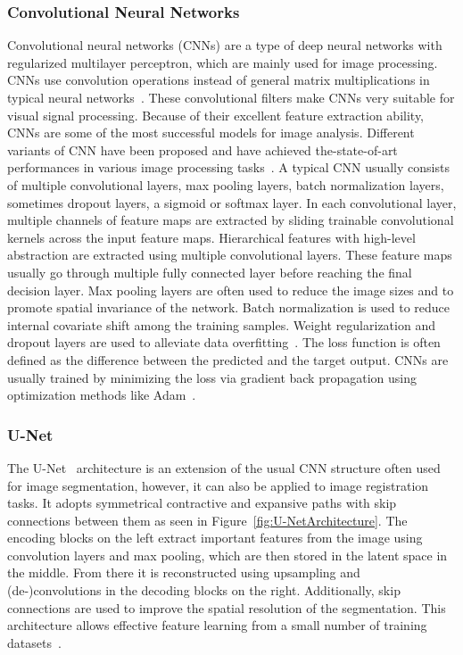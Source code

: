 \subsubsection{Convolutional Neural Networks} \label{SubSubSec:CNNs}
Convolutional neural networks (CNNs) are a type of deep neural networks with regularized multilayer perceptron, which are mainly used for image processing. CNNs use convolution operations instead of general matrix multiplications in typical neural networks~\cite{CNN1,CNN2}. These convolutional filters make CNNs very suitable for visual signal processing. Because of their excellent feature extraction ability, CNNs are some of the most successful models for image analysis. Different variants of CNN have been proposed and have achieved the-state-of-art performances in various image processing tasks~\cite{CNN2}. A typical CNN usually consists of multiple convolutional layers, max pooling layers, batch normalization layers, sometimes dropout layers, a sigmoid or softmax layer. In each convolutional layer, multiple channels of feature maps are extracted by sliding trainable convolutional kernels across the input feature maps. Hierarchical features with high-level abstraction are extracted using multiple convolutional layers. These feature maps usually go through multiple fully connected layer before reaching the final decision layer. Max pooling layers are often used to reduce the image sizes and to promote spatial invariance of the network. Batch normalization is used to reduce internal covariate shift among the training samples. Weight regularization and dropout layers are used to alleviate data overfitting~\cite{Fu2020}. The loss function is often defined as the difference between the predicted and the target output. CNNs are usually trained by minimizing the loss via gradient back propagation using optimization methods like Adam~\cite{Adam}. %

\subsubsection{U-Net} \label{SubSubSec:U-Net}
The U-Net~\cite{U-Net} architecture is an extension of the usual CNN structure often used for image segmentation, however, it can also be applied to image registration tasks. It adopts symmetrical contractive and expansive paths with skip connections between them as seen in Figure~\ref{fig:U-NetArchitecture}. The encoding blocks on the left extract important features from the image using convolution layers and max pooling, which are then stored in the latent space in the middle. From there it is reconstructed using upsampling and (de-)convolutions in the decoding blocks on the right. Additionally, skip connections are used to improve the spatial resolution of the segmentation. This architecture allows effective feature learning from a small number of training datasets~\cite{Fu2020}. 

